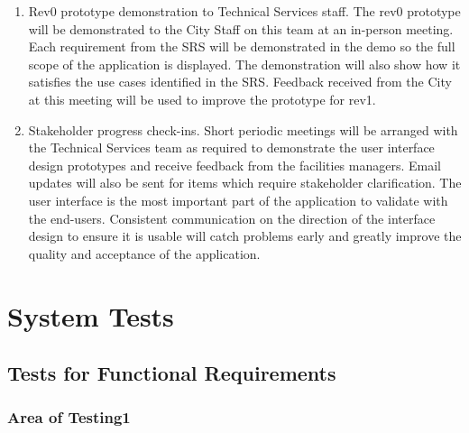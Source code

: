 \documentclass[12pt, titlepage]{article}
\begin{document}
\begin{enumerate}
  \item Rev0 prototype demonstration to Technical Services staff. The rev0
    prototype will be demonstrated to the City Staff on this team at
    an in-person
    meeting. Each requirement from the SRS will be demonstrated in
    the demo so the
    full scope of the application is displayed. The demonstration will also show
    how it satisfies the use cases identified in the SRS. Feedback
    received from the
    City at this meeting will be used to improve the prototype for rev1.

  \item Stakeholder progress check-ins. Short periodic meetings will be arranged
    with the Technical Services team as required to demonstrate the
    user interface
    design prototypes and receive feedback from the facilities
    managers. Email updates
    will also be sent for items which require stakeholder
    clarification. The user interface is the most important part of
    the application to validate with the end-users.
    Consistent communication on the direction of the interface design
    to ensure it
    is usable will catch problems early and greatly improve the quality and
    acceptance of the application.
\end{enumerate}

\section{System Tests}


\subsection{Tests for Functional Requirements}



\subsubsection{Area of Testing1}
\end{document}
